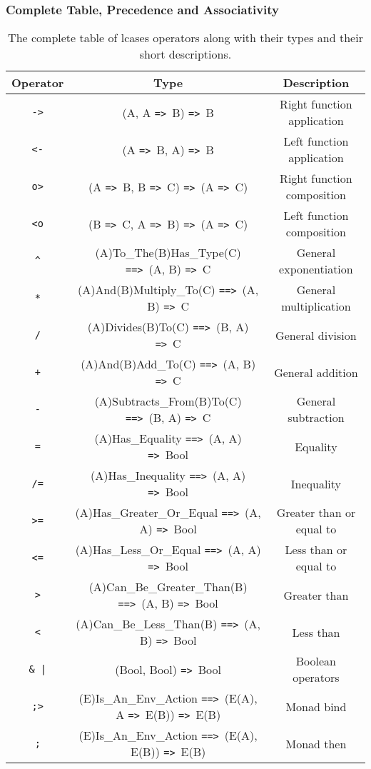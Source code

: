 \documentclass{article}
\def\ra{\texttt{=>}\ }
\def\Ra{\texttt{==>}\ }
\begin{document}
\subsubsection{Complete Table, Precedence and Associativity}
\begin{table}[h!]

\caption{
The complete table of lcases operators along with their types and 
their short descriptions.
}

\begin{center}
\begin{tabular}{ |c|c|c| } 
\hline
Operator & Type & Description \\ 
\hline
\hline
\texttt{->} & (A, A \ra B) \ra B & Right function application \\
\hline
\texttt{<-} & (A \ra B, A) \ra B & Left function application \\
\hline
\texttt{o>} & (A \ra B, B \ra C) \ra (A \ra C) & Right function composition \\
\hline
\texttt{<o} & (B \ra C, A \ra B) \ra (A \ra C) & Left function composition \\
\hline
\texttt{\^} & (A)To_The(B)Has_Type(C) \Ra (A, B) \ra C & General exponentiation  \\
\hline
\texttt{*} & (A)And(B)Multiply_To(C) \Ra (A, B) \ra C & General multiplication  \\
\hline
\texttt{/} & (A)Divides(B)To(C) \Ra (B, A) \ra C & General division \\
\hline
\texttt{+} & (A)And(B)Add_To(C) \Ra (A, B) \ra C & General addition \\ 
\hline
\texttt{-} & (A)Subtracts_From(B)To(C) \Ra (B, A) \ra C & General subtraction \\
\hline
\texttt{=} & (A)Has_Equality \Ra (A, A) \ra Bool & Equality \\
\hline
\texttt{/=} & (A)Has_Inequality \Ra (A, A) \ra Bool & Inequality \\
\hline
\texttt{>=} & (A)Has_Greater_Or_Equal \Ra (A, A) \ra Bool
& Greater than or equal to \\
\hline
\texttt{<=} & (A)Has_Less_Or_Equal \Ra (A, A) \ra Bool & Less than or equal to \\
\hline
\texttt{>} & (A)Can_Be_Greater_Than(B) \Ra (A, B) \ra Bool & Greater than \\
\hline
\texttt{<} & (A)Can_Be_Less_Than(B) \Ra (A, B) \ra Bool & Less than \\
\hline
\texttt{\& |} & (Bool, Bool) \ra Bool & Boolean operators \\
\hline
\texttt{;>} & (E)Is_An_Env_Action \Ra (E(A), A \ra E(B)) \ra E(B) &
Monad bind \\
\hline
\texttt{;} & (E)Is_An_Env_Action \Ra (E(A), E(B)) \ra E(B) &
Monad then \\
\hline
\end{tabular}
\end{center}

\label{table:allops}

\end{table}\mbox{}\\
\end{document}
